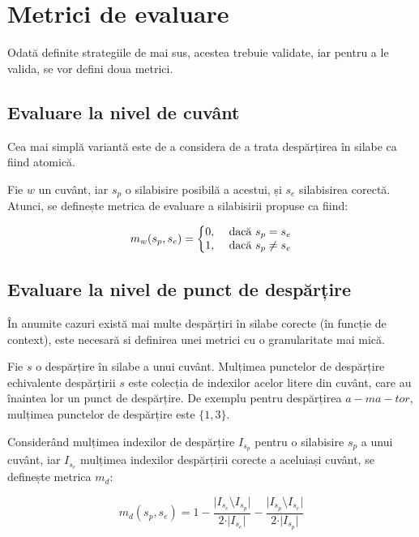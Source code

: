 \section{Metrici de evaluare}

Odată definite strategiile de mai sus, acestea trebuie validate, iar pentru a le valida, se vor defini doua metrici.

\subsection{Evaluare la nivel de cuvânt}


Cea mai simplă variantă este de a considera de a trata despărțirea în silabe ca fiind atomică.

\begin{defi} Fie $w$ un cuvânt, iar $s_p$ o silabisire posibilă a acestui, și $s_e$ silabisirea corectă. Atunci, se definește metrica de evaluare a silabisirii propuse ca fiind:

\begin{equation}
m_w(s_p,s_e) = \left\{
\begin{matrix}
0, 	& $ dacă $ s_p=s_e\\ 
1,	& $ dacă $ s_p\neq s_e \\
\end{matrix}
\right. 
\end{equation}
\end{defi}

\subsection{Evaluare la nivel de punct de despărțire}

În anumite cazuri există mai multe despărțiri în silabe corecte (în funcție de context), este necesară si definirea unei metrici cu o granularitate mai mică.

\begin{defi}
Fie $s$ o despărțire în silabe a unui cuvânt. Mulțimea punctelor de despărțire echivalente despărțirii $s$ este colecția de indexilor acelor litere din cuvânt, care au înaintea lor un punct de despărțire. De exemplu pentru despărțirea $a-ma-tor$, mulțimea punctelor de despărțire este $\{1,3\}$.
\end{defi}


\begin{defi}
Considerând mulțimea indexilor de despărțire $I_{s_p}$ pentru o silabisire $s_p$ a unui cuvânt, iar $I_{s_e}$ mulțimea indexilor despărțirii corecte a aceluiași cuvânt, se definește metrica $m_d$:

\begin{equation}
m_d(s_p,s_e) = 1- \frac{\vert I_{s_e} \setminus I_{s_p} \vert}{2 \cdot \vert I_{s_e} \vert} - \frac{\vert I_{s_p} \setminus I_{s_e} \vert}{2 \cdot \vert I_{s_p} \vert}
\end{equation}
\end{defi}

